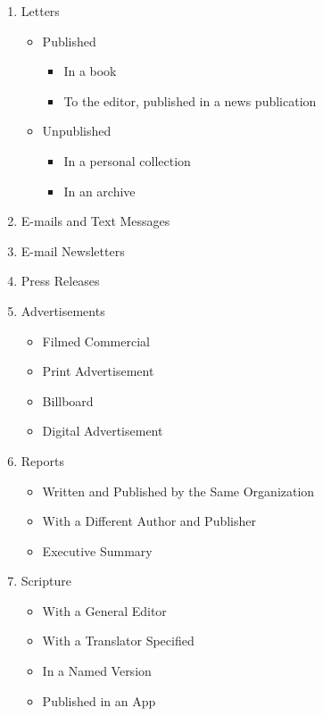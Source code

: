 \documentclass{article}
\begin{document}
\begin{enumerate}
	\item Letters
	\begin{itemize}
		\item Published
		\begin{itemize}
			\item In a book
			\item To the editor, published in a news publication
		\end{itemize}
		\item Unpublished
		\begin{itemize}
			\item In a personal collection
			\item In an archive
		\end{itemize}
	\end{itemize}
	
	\item E-mails and Text Messages
	
	\item E-mail Newsletters
	
	\item Press Releases
	
	\item Advertisements
	\begin{itemize}
		\item Filmed Commercial
		\item Print Advertisement
		\item Billboard
		\item Digital Advertisement
	\end{itemize}
	
	\item Reports
	\begin{itemize}
		\item Written and Published by the Same Organization
		\item With a Different Author and Publisher
		\item Executive Summary
	\end{itemize}
	
	\item Scripture
	\begin{itemize}
		\item With a General Editor
		\item With a Translator Specified
		\item In a Named Version
		\item Published in an App
	\end{itemize}
	

\end{enumerate}
\end{document}
